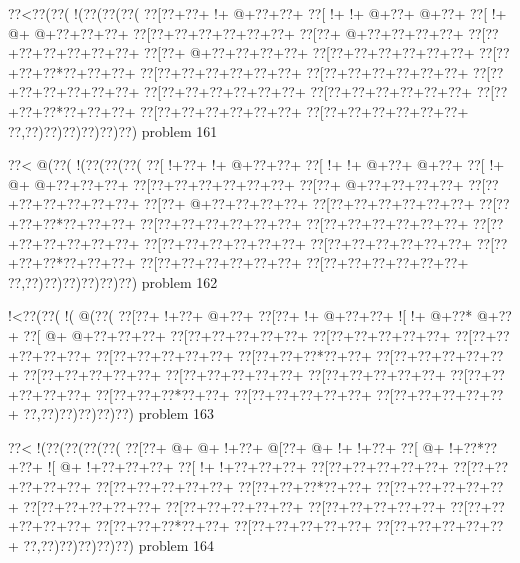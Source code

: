 \vbox{\vbox{\goo
\0??<\0??(\0??(\- !(\0??(\0??(\0??(
\0??[\0??+\0??+\- !+\- @+\0??+\0??+
\0??[\- !+\- !+\- @+\0??+\- @+\0??+
\0??[\- !+\- @+\- @+\0??+\0??+\0??+
\0??[\0??+\0??+\0??+\0??+\0??+\0??+
\0??[\0??+\- @+\0??+\0??+\0??+\0??+
\0??[\0??+\0??+\0??+\0??+\0??+\0??+
\0??[\0??+\- @+\0??+\0??+\0??+\0??+
\0??[\0??+\0??+\0??+\0??+\0??+\0??+
\0??[\0??+\0??+\0??*\0??+\0??+\0??+
\0??[\0??+\0??+\0??+\0??+\0??+\0??+
\0??[\0??+\0??+\0??+\0??+\0??+\0??+
\0??[\0??+\0??+\0??+\0??+\0??+\0??+
\0??[\0??+\0??+\0??+\0??+\0??+\0??+
\0??[\0??+\0??+\0??+\0??+\0??+\0??+
\0??[\0??+\0??+\0??*\0??+\0??+\0??+
\0??[\0??+\0??+\0??+\0??+\0??+\0??+
\0??[\0??+\0??+\0??+\0??+\0??+\0??+
\0??,\0??)\0??)\0??)\0??)\0??)\0??)
}
\hfil problem 161\hfil\break
}

\vbox{\vbox{\goo
\0??<\- @(\0??(\- !(\0??(\0??(\0??(
\0??[\- !+\0??+\- !+\- @+\0??+\0??+
\0??[\- !+\- !+\- @+\0??+\- @+\0??+
\0??[\- !+\- @+\- @+\0??+\0??+\0??+
\0??[\0??+\0??+\0??+\0??+\0??+\0??+
\0??[\0??+\- @+\0??+\0??+\0??+\0??+
\0??[\0??+\0??+\0??+\0??+\0??+\0??+
\0??[\0??+\- @+\0??+\0??+\0??+\0??+
\0??[\0??+\0??+\0??+\0??+\0??+\0??+
\0??[\0??+\0??+\0??*\0??+\0??+\0??+
\0??[\0??+\0??+\0??+\0??+\0??+\0??+
\0??[\0??+\0??+\0??+\0??+\0??+\0??+
\0??[\0??+\0??+\0??+\0??+\0??+\0??+
\0??[\0??+\0??+\0??+\0??+\0??+\0??+
\0??[\0??+\0??+\0??+\0??+\0??+\0??+
\0??[\0??+\0??+\0??*\0??+\0??+\0??+
\0??[\0??+\0??+\0??+\0??+\0??+\0??+
\0??[\0??+\0??+\0??+\0??+\0??+\0??+
\0??,\0??)\0??)\0??)\0??)\0??)\0??)
}
\hfil problem 162\hfil\break
}

\vbox{\vbox{\goo
\- !<\0??(\0??(\- !(\- @(\0??(
\0??[\0??+\- !+\0??+\- @+\0??+
\0??[\0??+\- !+\- @+\0??+\0??+
\- ![\- !+\- @+\0??*\- @+\0??+
\0??[\- @+\- @+\0??+\0??+\0??+
\0??[\0??+\0??+\0??+\0??+\0??+
\0??[\0??+\0??+\0??+\0??+\0??+
\0??[\0??+\0??+\0??+\0??+\0??+
\0??[\0??+\0??+\0??+\0??+\0??+
\0??[\0??+\0??+\0??*\0??+\0??+
\0??[\0??+\0??+\0??+\0??+\0??+
\0??[\0??+\0??+\0??+\0??+\0??+
\0??[\0??+\0??+\0??+\0??+\0??+
\0??[\0??+\0??+\0??+\0??+\0??+
\0??[\0??+\0??+\0??+\0??+\0??+
\0??[\0??+\0??+\0??*\0??+\0??+
\0??[\0??+\0??+\0??+\0??+\0??+
\0??[\0??+\0??+\0??+\0??+\0??+
\0??,\0??)\0??)\0??)\0??)\0??)
}
\hfil problem 163\hfil\break
}

\vbox{\vbox{\goo
\0??<\- !(\0??(\0??(\0??(\0??(
\0??[\0??+\- @+\- @+\- !+\0??+
\- @[\0??+\- @+\- !+\- !+\0??+
\0??[\- @+\- !+\0??*\0??+\0??+
\- ![\- @+\- !+\0??+\0??+\0??+
\0??[\- !+\- !+\0??+\0??+\0??+
\0??[\0??+\0??+\0??+\0??+\0??+
\0??[\0??+\0??+\0??+\0??+\0??+
\0??[\0??+\0??+\0??+\0??+\0??+
\0??[\0??+\0??+\0??*\0??+\0??+
\0??[\0??+\0??+\0??+\0??+\0??+
\0??[\0??+\0??+\0??+\0??+\0??+
\0??[\0??+\0??+\0??+\0??+\0??+
\0??[\0??+\0??+\0??+\0??+\0??+
\0??[\0??+\0??+\0??+\0??+\0??+
\0??[\0??+\0??+\0??*\0??+\0??+
\0??[\0??+\0??+\0??+\0??+\0??+
\0??[\0??+\0??+\0??+\0??+\0??+
\0??,\0??)\0??)\0??)\0??)\0??)
}
\hfil problem 164\hfil\break
}

